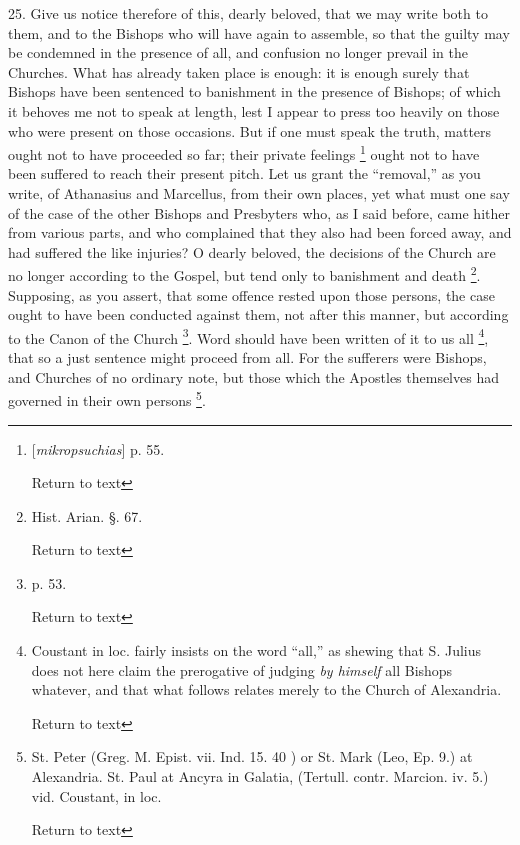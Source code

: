 25. Give us notice therefore of this, dearly
beloved, that we may write both to them, and to the Bishops who will
have again to assemble, so that the guilty may be condemned in the
presence of all, and confusion no longer prevail in the Churches. What
has already taken place is enough: it is enough surely that Bishops
have been sentenced to banishment in the presence of Bishops; of
which it behoves me not to speak at length, lest I appear to press too
heavily on those who were present on those occasions. But if one must
speak the truth, matters ought not to have proceeded so far; their
private feelings \footnote{[\emph{mikropsuchias}] p. 55.

Return to text}
ought not to have been suffered to reach their present pitch. Let us
grant the ``removal,'' as you write, of Athanasius and Marcellus, from
their own places, yet what must one say of the case of the other
Bishops and Presbyters who, as I said before, came hither from various
parts, and who complained that they also had been forced away, and had
suffered the like injuries? O dearly beloved, the decisions of the
Church are no longer according to the Gospel, but tend only to
banishment and death \footnote{Hist. Arian. §. 67.

Return to text}.
Supposing, as you assert, that some offence rested upon those persons,
the case ought to have been conducted against them, not after this
manner, but according to the Canon of the Church \footnote{p. 53.

Return to text}. Word should have been written of it to us all \footnote{Coustant in loc. fairly insists on the word ``all,'' as shewing that S.
Julius does not here claim the prerogative of judging \emph{by himself}
all Bishops whatever, and that what follows relates merely to the
Church of Alexandria.

Return to text}, that so a just sentence might proceed from all. For the
sufferers were Bishops, and Churches of no ordinary note, but those
which the Apostles themselves had governed in their own persons \footnote{St. Peter (Greg. M. Epist. vii. Ind. 15. 40 ) or St. Mark (Leo, Ep.
9.) at Alexandria. St. Paul at Ancyra in Galatia, (Tertull. contr.
Marcion. iv. 5.) vid. Coustant, in loc.

Return to text}.


